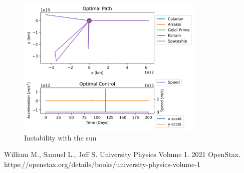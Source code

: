 \documentclass[11pt]{amsart}
\begin{document}
\begin{figure}[htp]
    \centering
    \includegraphics[width=0.8\textwidth]{instability_sun.png}\hfill
    \caption{Instability with the sun}
    \label{fig:fixed_time_sun}
\end{figure}







\FloatBarrier %
\newpage


\begin{thebibliography}{99}
 William M., Samuel L., Jeff S. University Physics Volume 1. 2021 OpenStax. https://openstax.org/details/books/university-physics-volume-1 

\end{thebibliography}
\end{document}
